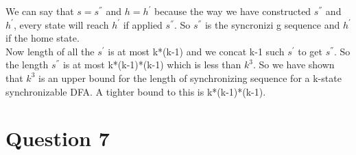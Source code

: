 \documentclass{article}
\begin{document}
We can say that $s=s^{''}$ and $h=h^{'}$ because the way we have constructed $s^{''}$ and $h^{'}$, every state will reach $h^{'}$ if applied $s^{''}$. So $s^{''}$ is the syncronizi g sequence and $h^{'}$ if the home state. \\
Now length of all the  $s^{'}$ is at most k*(k-1) and we concat k-1 such  $s^{'}$ to get  $s^{''}$. So the length  $s^{''}$ is at most k*(k-1)*(k-1) which is less than $k^3$. So we have shown that $k^3$ is an upper bound for the length of synchronizing sequence for a k-state synchronizable DFA. A tighter bound to this is k*(k-1)*(k-1).
\pagebreak




\section{Question 7}


\pagebreak
\end{document}
